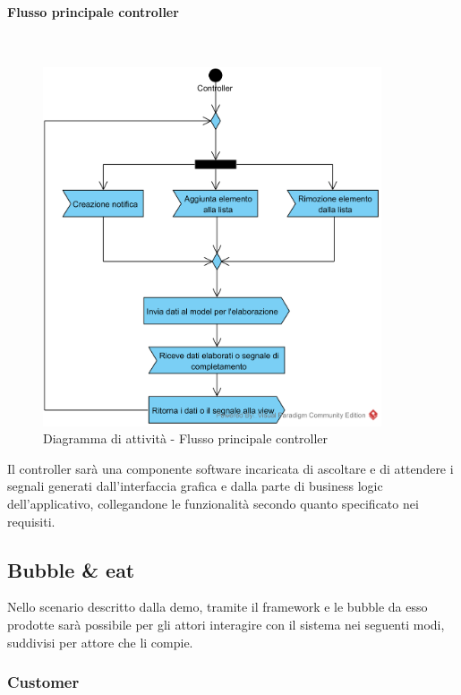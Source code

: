 \paragraph{Flusso principale controller}\mbox{}\\
\nopagebreak
\begin{figure}[H]
	\centering
	\includegraphics[width=10cm]{../../documenti/SpecificaTecnica/diagrammi_img/attivita/todo_controller.png}
	\caption{Diagramma di attività - Flusso principale controller}
\end{figure}


Il controller sarà una componente software incaricata di ascoltare e di attendere i segnali generati dall'interfaccia grafica e dalla parte di business logic dell'applicativo, collegandone le funzionalità secondo quanto specificato nei requisiti. 

\subsection{Bubble \& eat}
Nello scenario descritto dalla demo, tramite il framework e le bubble da esso prodotte sarà possibile per gli attori interagire con il sistema nei seguenti modi, suddivisi per attore che li compie.

\subsubsection{Customer}

